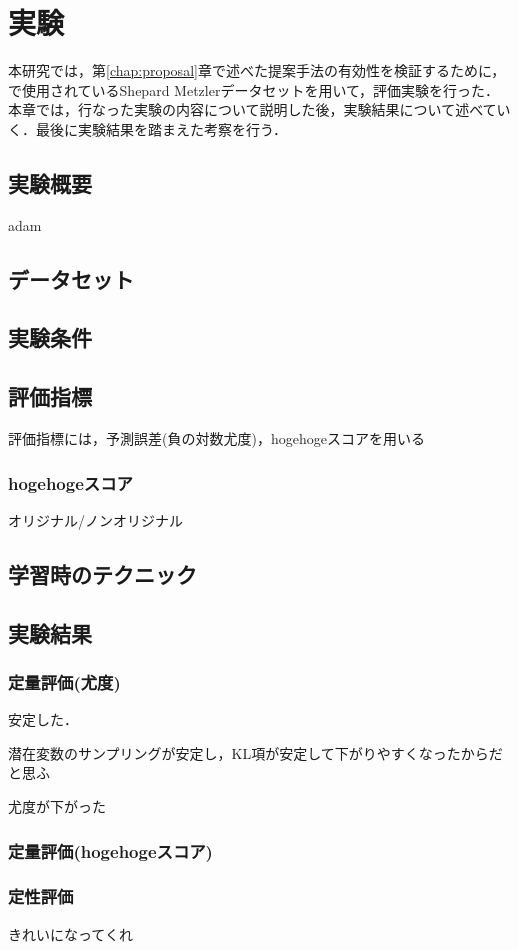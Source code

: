 \chapter{実験}
\label{chap:experiment}
本研究では，第\ref{chap:proposal}章で述べた提案手法の有効性を検証するために， で使用されているShepard Metzlerデータセットを用いて，評価実験を行った．本章では，行なった実験の内容について説明した後，実験結果について述べていく．最後に実験結果を踏まえた考察を行う．

\section{実験概要}
adam
\section{データセット}

\section{実験条件}

\section{評価指標}
評価指標には，予測誤差(負の対数尤度)，hogehogeスコアを用いる
\subsection{hogehogeスコア}
オリジナル/ノンオリジナル


\section{学習時のテクニック}

\section{実験結果}

\subsection{定量評価(尤度)}

安定した．

潜在変数のサンプリングが安定し，KL項が安定して下がりやすくなったからだと思ふ

尤度が下がった

\subsection{定量評価(hogehogeスコア)}
\subsection{定性評価}
きれいになってくれ